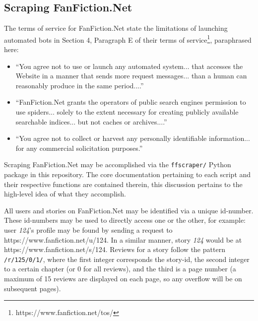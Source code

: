 \documentclass[letterpaper]{article}
\begin{document}
\subsection{Scraping FanFiction.Net}

The terms of service for FanFiction.Net state the limitations of launching automated bots in Section 4, Paragraph E of their terms of service\footnote{https://www.fanfiction.net/tos/}, paraphrased here:

\begin{itemize}
    \item ``You agree not to use or launch any automated system... that accesses the Website in a manner that sends more request messages... than a human can reasonably produce in the same period....''
    \item ``FanFiction.Net grants the operators of public search engines permission to use spiders... solely to the extent necessary for creating publicly available searchable indices... but not caches or archives....''
    \item ``You agree not to collect or harvest any personally identifiable information... for any commercial solicitation purposes.''
\end{itemize}

Scraping FanFiction.Net may be accomplished via the \texttt{ffscraper/} Python package in this repository. The core documentation pertaining to each script and their respective functions are contained therein, this discussion pertains to the high-level idea of what they accomplish.

All users and stories on FanFiction.Net may be identified via a unique id-number. These id-numbers may be used to directly access one or the other, for example: user \textit{124}'s profile may be found by sending a request to https://www.fanfiction.net/u/124. In a similar manner, story \textit{124} would be at https://www.fanfiction.net/s/124. Reviews for a story follow the pattern \texttt{/r/125/0/1/}, where the first integer corresponds the story-id, the second integer to a certain chapter (or 0 for all reviews), and the third is a page number (a maximum of 15 reviews are displayed on each page, so any overflow will be on subsequent pages).



\end{document}
